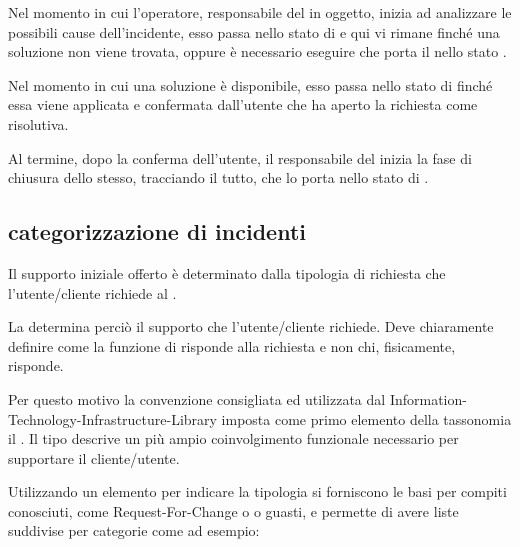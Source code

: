 Nel momento in cui l'operatore, responsabile del  in oggetto, inizia ad analizzare le possibili cause dell'incidente, esso passa nello stato di  e qui vi rimane finché una soluzione non viene trovata, oppure è necessario eseguire  che porta il  nello stato .

Nel momento in cui una soluzione è disponibile, esso passa nello stato di  finché essa viene applicata e confermata dall'utente che ha aperto la richiesta come risolutiva.

Al termine, dopo la conferma dell'utente, il responsabile del  inizia la fase di chiusura dello stesso, tracciando il tutto, che lo porta nello stato di .

\subsection[Categorizzazione di incidenti]{categorizzazione di incidenti}
\label{prc-incident-category}
Il supporto iniziale offerto è determinato dalla tipologia di richiesta che l'utente/cliente richiede al . 

La  determina perciò il supporto che l'utente/cliente richiede. Deve chiaramente definire come la funzione di  risponde alla richiesta e non chi, fisicamente, risponde.

Per questo motivo la convenzione consigliata ed utilizzata dal  \ac{Information-Technology-Infrastructure-Library} imposta come primo elemento della tassonomia il . Il tipo descrive un più ampio coinvolgimento funzionale necessario per supportare il cliente/utente.

Utilizzando un elemento per indicare la tipologia si forniscono le basi per compiti conosciuti, come \ac{Request-For-Change} o  o guasti, e permette di avere liste suddivise per categorie come ad esempio:

